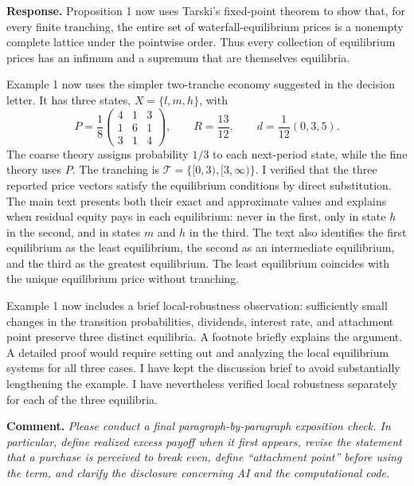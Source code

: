 \documentclass[11pt]{article}
\newcommand{\commenttext}[1]{\par\noindent\textbf{Comment.} \textit{#1}\par}
\newcommand{\response}[1]{\par\noindent\textbf{Response.} #1\par}
\begin{document}
\response{Proposition 1 now uses Tarski's fixed-point theorem to show that, for every finite tranching, the entire set of waterfall-equilibrium prices is a nonempty complete lattice under the pointwise order. Thus every collection of equilibrium prices has an infimum and a supremum that are themselves equilibria.

Example 1 now uses the simpler two-tranche economy suggested in the decision letter. It has three states, $X=\{l,m,h\}$, with
\[
P=\frac18
\begin{pmatrix}
4&1&3\\
1&6&1\\
3&1&4
\end{pmatrix},
\qquad
R=\frac{13}{12},
\qquad
d=\frac1{12}(0,3,5).
\]
The coarse theory assigns probability $1/3$ to each next-period state, while the fine theory uses $P$. The tranching is $\mathcal T=\{[0,3),[3,\infty)\}$. I verified that the three reported price vectors satisfy the equilibrium conditions by direct substitution. The main text presents both their exact and approximate values and explains when residual equity pays in each equilibrium: never in the first, only in state $h$ in the second, and in states $m$ and $h$ in the third. The text also identifies the first equilibrium as the least equilibrium, the second as an intermediate equilibrium, and the third as the greatest equilibrium. The least equilibrium coincides with the unique equilibrium price without tranching.

Example 1 now includes a brief local-robustness observation: sufficiently small changes in the transition probabilities, dividends, interest rate, and attachment point preserve three distinct equilibria. A footnote briefly explains the argument. A detailed proof would require setting out and analyzing the local equilibrium systems for all three cases. I have kept the discussion brief to avoid substantially lengthening the example. I have nevertheless verified local robustness separately for each of the three equilibria.}

\clearpage
\commenttext{Please conduct a final paragraph-by-paragraph exposition check. In particular, define realized excess payoff when it first appears, revise the statement that a purchase is perceived to break even, define ``attachment point'' before using the term, and clarify the disclosure concerning AI and the computational code.}
\end{document}
